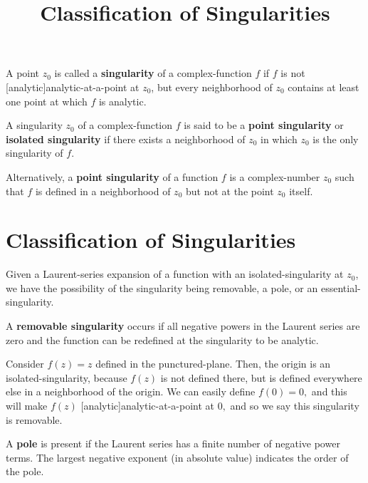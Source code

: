 \documentclass{article}
\title{Classification of Singularities}
\begin{document}
\begin{definition}[Singularity]
A point $z_0$ is called a \textbf{singularity} of a \@{complex-function} $f$ if $f$ is not \@[analytic]{analytic-at-a-point} at $z_0$, but every \@{neighborhood} of $z_0$ contains at least one point at which $f$ is analytic.
\end{definition}

\begin{definition}
A \@{singularity} $z_0$ of a \@{complex-function} $f$ is said to be a \textbf{point singularity} or \textbf{isolated singularity} if there exists a \@{neighborhood} of $z_0$ in which $z_0$ is the only \@{singularity} of $f$.

Alternatively, a \textbf{point singularity} of a function $f$ is a \@{complex-number} $z_0$ such that $f$ is defined in a \@{neighborhood} of $z_0$ but not at the point $z_0$ itself.
\end{definition}

\section{Classification of Singularities}

Given a \@{Laurent-series} expansion of a \@{function} with an \@{isolated-singularity} at $z_0$, we have the possibility of the \@{singularity} being \@{removable}, a \@{pole}, or an \@{essential-singularity}.

\begin{definition}
A \textbf{removable singularity} occurs if all negative powers in the Laurent series are zero and the function can be redefined at the \@{singularity} to be \@{analytic}.
\end{definition}

\begin{example}
Consider $f(z) = z$ defined in the \@{punctured-plane}. Then, the \@{origin} is an \@{isolated-singularity}, because $f(z)$ is not defined there, but is defined everywhere else in a \@{neighborhood} of the origin. We can easily define $f(0) = 0,$ and this will make $f(z)$ \@[analytic]{analytic-at-a-point} at $0,$ and so we say this \@{singularity} is \@{removable}.
\end{example}

\begin{definition}[Pole]
A \textbf{pole} is present if the Laurent series has a finite number of negative power terms. The largest negative exponent (in absolute value) indicates the order of the pole.
\end{definition}
\end{document}
